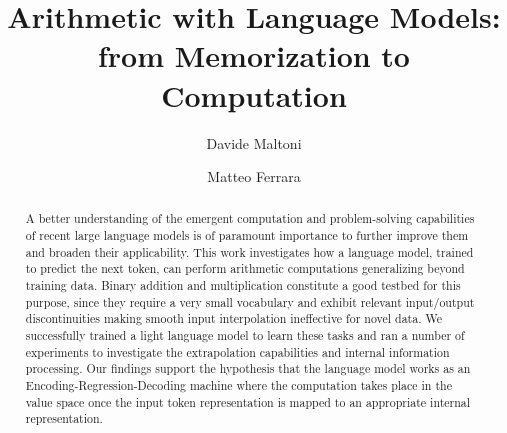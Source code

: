 \documentclass[final,1p,times,authoryear]{elsarticle}
\begin{document}
\begin{frontmatter}



\title{Arithmetic with Language Models: from Memorization to Computation
}


\author[1]{Davide Maltoni}

\author[1]{Matteo Ferrara}


\begin{abstract}
A better understanding of the emergent computation and problem-solving capabilities of recent large language models is of paramount importance to further improve them and broaden their applicability. This work investigates how a language model, trained to predict the next token, can perform arithmetic computations generalizing beyond training data. Binary addition and multiplication constitute a good testbed for this purpose, since they require a very small vocabulary and exhibit relevant input/output discontinuities making smooth input interpolation ineffective for novel data. We successfully trained a light language model to learn these tasks and ran a number of experiments to investigate the extrapolation capabilities and internal information processing. Our findings support the hypothesis that the language model works as an Encoding-Regression-Decoding machine where the computation takes place in the value space once the input token representation is mapped to an appropriate internal representation.
\end{abstract}


\end{frontmatter}
\end{document}
